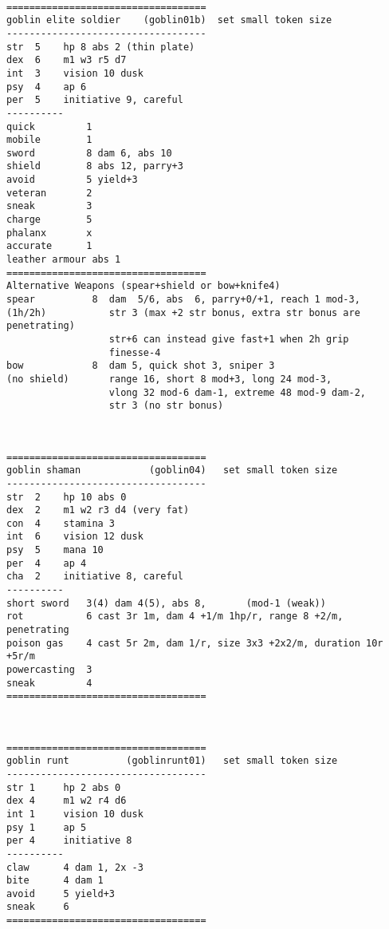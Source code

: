 \

\goodbreak \begin{samepage} \small \begin{verbatim}
===================================
goblin elite soldier    (goblin01b)  set small token size
-----------------------------------
str  5    hp 8 abs 2 (thin plate)
dex  6    m1 w3 r5 d7
int  3    vision 10 dusk
psy  4    ap 6
per  5    initiative 9, careful
----------
quick         1
mobile        1
sword         8 dam 6, abs 10
shield        8 abs 12, parry+3
avoid         5 yield+3
veteran       2
sneak         3
charge        5
phalanx       x
accurate      1
leather armour abs 1
===================================
Alternative Weapons (spear+shield or bow+knife4)
spear          8  dam  5/6, abs  6, parry+0/+1, reach 1 mod-3,
(1h/2h)           str 3 (max +2 str bonus, extra str bonus are penetrating)
                  str+6 can instead give fast+1 when 2h grip
                  finesse-4
bow            8  dam 5, quick shot 3, sniper 3
(no shield)       range 16, short 8 mod+3, long 24 mod-3,
                  vlong 32 mod-6 dam-1, extreme 48 mod-9 dam-2,
                  str 3 (no str bonus)
\end{verbatim} \normalsize \end{samepage}

\

\goodbreak \begin{samepage} \small \begin{verbatim}
===================================
goblin shaman            (goblin04)   set small token size
-----------------------------------
str  2    hp 10 abs 0
dex  2    m1 w2 r3 d4 (very fat)
con  4    stamina 3
int  6    vision 12 dusk
psy  5    mana 10
per  4    ap 4
cha  2    initiative 8, careful
----------
short sword   3(4) dam 4(5), abs 8,       (mod-1 (weak))
rot           6 cast 3r 1m, dam 4 +1/m 1hp/r, range 8 +2/m, penetrating
poison gas    4 cast 5r 2m, dam 1/r, size 3x3 +2x2/m, duration 10r +5r/m
powercasting  3
sneak         4
===================================
\end{verbatim} \normalsize \end{samepage}

\

\goodbreak \begin{samepage} \small \begin{verbatim}
===================================
goblin runt          (goblinrunt01)   set small token size
-----------------------------------
str 1     hp 2 abs 0
dex 4     m1 w2 r4 d6
int 1     vision 10 dusk
psy 1     ap 5
per 4     initiative 8
----------
claw      4 dam 1, 2x -3
bite      4 dam 1
avoid     5 yield+3
sneak     6
===================================
\end{verbatim} \normalsize \end{samepage}

